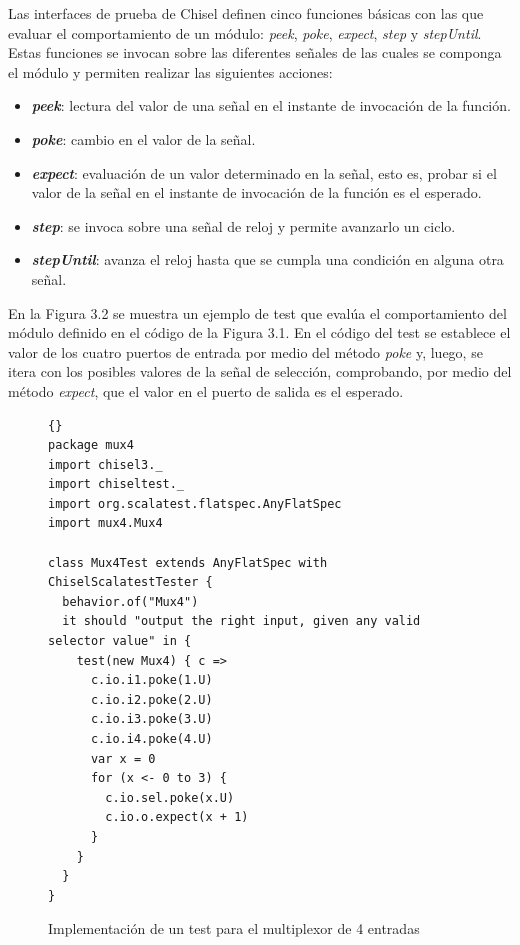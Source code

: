 Las interfaces de prueba de Chisel definen cinco funciones básicas con las que evaluar el comportamiento de un módulo: \textit{peek}, \textit{poke}, \textit{expect}, \textit{step} y \textit{stepUntil}. Estas funciones se invocan sobre las diferentes señales de las cuales se componga el módulo y permiten realizar las siguientes acciones:

\vspace{-0.1cm}
\begin{itemize}
  \item \textbf{\textit{peek}}: lectura del valor de una señal en el instante de invocación de la función.
  \vspace{-0.3cm}
  \item \textbf{\textit{poke}}: cambio en el valor de la señal.
  \vspace{-0.3cm}
  \item \textbf{\textit{expect}}: evaluación de un valor determinado en la señal, esto es, probar si el valor de la señal en el instante de invocación de la función es el esperado.
  \vspace{-0.3cm}
  \item \textbf{\textit{step}}: se invoca sobre una señal de reloj y permite avanzarlo un ciclo.
  \vspace{-0.3cm}
  \item \textbf{\textit{stepUntil}}: avanza el reloj hasta que se cumpla una condición en alguna otra señal.
\end{itemize}
\vspace{-0.1cm}

En la Figura 3.2 se muestra un ejemplo de test que evalúa el comportamiento del módulo definido en el código de la Figura 3.1. En el código del test se establece el valor de los cuatro puertos de entrada por medio del método \textit{poke} y, luego, se itera con los posibles valores de la señal de selección, comprobando, por medio del método \textit{expect}, que el valor en el puerto de salida es el esperado.

\vspace{+0.25cm}
\begin{figure}[h]
\begin{lstlisting}[style=scalaStyle]{}
package mux4
import chisel3._
import chiseltest._
import org.scalatest.flatspec.AnyFlatSpec
import mux4.Mux4

class Mux4Test extends AnyFlatSpec with ChiselScalatestTester {
  behavior.of("Mux4")
  it should "output the right input, given any valid selector value" in {
    test(new Mux4) { c =>
      c.io.i1.poke(1.U)
      c.io.i2.poke(2.U)
      c.io.i3.poke(3.U)
      c.io.i4.poke(4.U)
      var x = 0
      for (x <- 0 to 3) {
        c.io.sel.poke(x.U)
        c.io.o.expect(x + 1)
      }
    }
  }
}
\end{lstlisting}
\vspace{-0.1cm}
\caption{Implementación de un test para el multiplexor de 4 entradas}
\end{figure}

